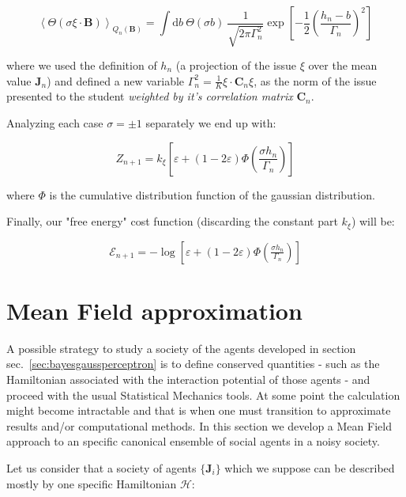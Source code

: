 \documentclass[12pt,a4paperpaper,]{tufte-book}
\begin{document}
\[\left\langle \Theta( \sigma \xi \cdot \mathbf{B}) \right\rangle_{Q_n(\mathbf{B})} = \int \mathrm{d}b\ \Theta(\sigma b)\ \frac{1}{\sqrt{2\pi \Gamma_n^2}} \exp \left[ -\frac12 \left( \frac{h_n - b}{\Gamma_n} \right)^2 \right]\]

where we used the definition of \(h_n\) (a projection of the issue \(\xi\) over the mean value \(\mathbf{J}_n\)) and defined a new variable \(\Gamma_n^2 = \frac1K \xi \cdot \mathbf{C}_n \xi\), as the norm of the issue presented to the student \emph{weighted by it's correlation matrix} \(\mathbf{C}_n\).

Analyzing each case \(\sigma = \pm 1\) separately we end up with:

\begin{equation} Z_{n+1} = k_\xi \left[ \varepsilon + \left( 1 - 2\varepsilon \right)\Phi\left( \frac{\sigma h_n}{\Gamma_n}\right)\right] \label{eq:partitionbayesgaussperceptron}\end{equation}

where \(\Phi\) is the cumulative distribution function of the gaussian distribution.

Finally, our "free energy" cost function (discarding the constant part \(k_\xi\)) will be:

\begin{equation} \mathcal{E}_{n+1} = -\log\left[\varepsilon + \left(1 - 2\varepsilon\right) \Phi\left( \tfrac{\sigma h_n}{\Gamma_n} \right)\right] \label{eq:costbayesgaussperceptron}\end{equation}

\hypertarget{sec:meanfield}{%
\section{Mean Field approximation}\label{sec:meanfield}}

A possible strategy to study a society of the agents developed in section sec.~\ref{sec:bayesgaussperceptron} is to define conserved quantities - such as the Hamiltonian associated with the interaction potential of those agents - and proceed with the usual Statistical Mechanics tools. At some point the calculation might become intractable and that is when one must transition to approximate results and/or computational methods. In this section we develop a Mean Field approach to an specific canonical ensemble of social agents in a noisy society.

Let us consider that a society of agents \(\{ \mathbf{J}_i \}\) which we suppose can be described mostly by one specific Hamiltonian \(\mathcal{H}\):
\end{document}
